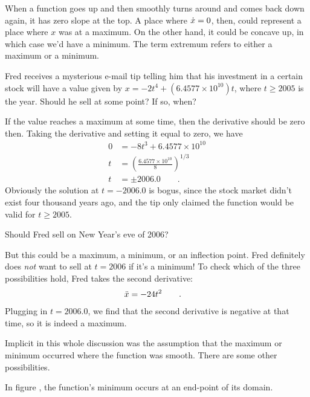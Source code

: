 When a function goes up and then smoothly turns around and comes back down again,
it has zero slope at the top. A place where $\dot{x}=0$, then, could represent
a place where $x$ was at a maximum. On the other hand, it could be concave up,
in which case we'd have a minimum. The term extremum refers to either a maximum or a minimum.

\begin{eg}
\egquestion Fred receives a mysterious e-mail tip telling him that his investment in a certain stock will
have a value given by $x=-2t^4+(6.4577\times10^{10})t$, where $t\ge 2005$ is the year. Should he sell at some point? If so, when?

\eganswer If the value reaches a maximum at some time, then the derivative should be zero then. Taking the
derivative and setting it equal to zero, we have
\begin{align*}
  0 &= -8t^3+6.4577\times10^{10}\\
  t &= \left(\frac{6.4577\times10^{10}}{8}\right)^{1/3} \\
  t &= \pm 2006.0 \qquad .
\end{align*}
Obviously the solution at $t=-2006.0$ is bogus, since the stock market didn't exist four thousand years ago, and
the tip only claimed the function would be valid for $t\ge 2005$.

Should Fred sell on New Year's eve of 2006?

But this could be a maximum, a minimum, or an inflection point. Fred definitely does \emph{not} want to
sell at $t=2006$ if it's a minimum! To check which of the three possibilities hold, Fred takes the
second derivative:
\begin{align*}
 \Ddot{x} &= -24t^2 \qquad .
\end{align*}
Plugging in $t=2006.0$, we find that the second derivative is negative at that time, so it is indeed a
maximum.
\end{eg}

Implicit in this whole discussion was the assumption that the maximum or minimum occurred where the function was
smooth. There are some other possibilities.

In figure , the function's minimum occurs at an end-point of its domain.
%
%

